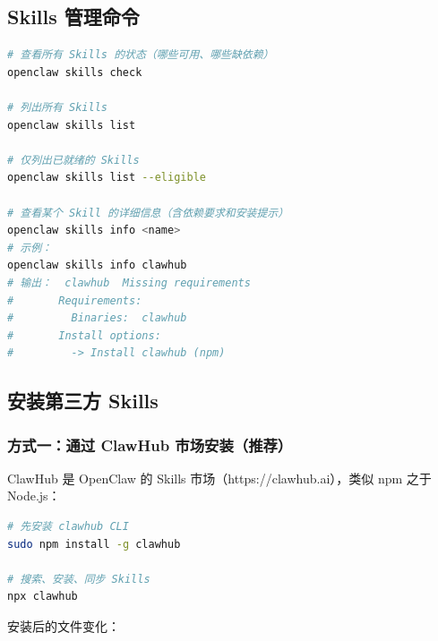 \subsection{Skills 管理命令}


\begin{lstlisting}[language=bash]
# 查看所有 Skills 的状态（哪些可用、哪些缺依赖）
openclaw skills check

# 列出所有 Skills
openclaw skills list

# 仅列出已就绪的 Skills
openclaw skills list --eligible

# 查看某个 Skill 的详细信息（含依赖要求和安装提示）
openclaw skills info <name>
# 示例：
openclaw skills info clawhub
# 输出：  clawhub  Missing requirements
#       Requirements:
#         Binaries:  clawhub
#       Install options:
#         -> Install clawhub (npm)
\end{lstlisting}

\subsection{安装第三方 Skills}


\subsubsection{方式一：通过 ClawHub 市场安装（推荐）}


ClawHub 是 OpenClaw 的 Skills 市场（https://clawhub.ai），类似 npm 之于 Node.js：

\begin{lstlisting}[language=bash]
# 先安装 clawhub CLI
sudo npm install -g clawhub

# 搜索、安装、同步 Skills
npx clawhub
\end{lstlisting}

安装后的文件变化：

\begin{figure}[htbp]
\centering
{}
\end{figure}

